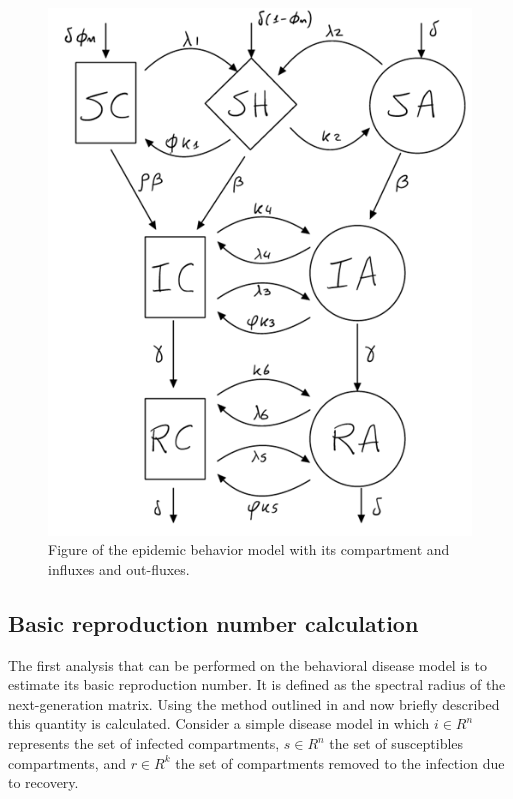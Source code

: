 \begin{figure}[tbph]
	\centering
	\includegraphics[width=0.5\linewidth]{1_corpo/figure/epi_behaviour_model_figure}
	\caption[Epidemic behavior model]{Figure of the epidemic behavior model with its compartment and influxes and out-fluxes.}
	\label{fig:epibehaviourmodelfigure}
\end{figure}

\subsection{Basic reproduction number calculation}
The first analysis that can be performed on the behavioral disease model is to estimate its basic reproduction number. It is defined as the spectral radius of the next-generation matrix. Using the method outlined in \cite{arino2007} and now briefly described this quantity is calculated. 
Consider a simple disease model in which $i \in R^n$ represents the set of infected compartments, $s \in R^n$ the set of susceptibles compartments, and $r \in R^k$ the set of compartments removed to the infection due to recovery. 

